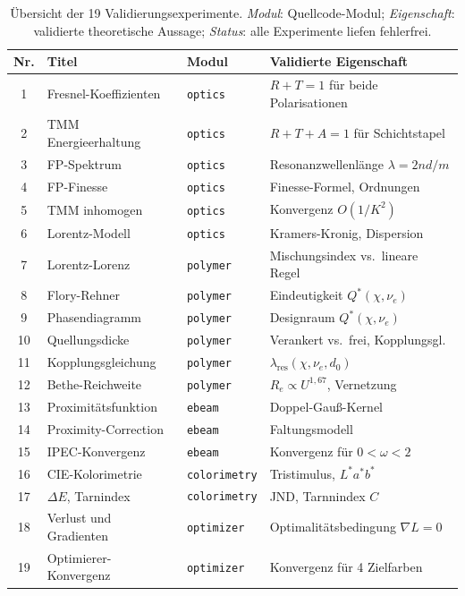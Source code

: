 ﻿\documentclass[a4paper,12pt]{article}
\theoremstyle{definition}
\begin{document}
	\begin{table}[htbp]
		\centering
		\caption{%
			Übersicht der 19 Validierungsexperimente.
			\emph{Modul}: Quellcode-Modul; \emph{Eigenschaft}: validierte
			theoretische Aussage; \emph{Status}: alle Experimente liefen
			fehlerfrei.
		}
		\label{tab:validierung}
		\small
		\begin{tabular}{clll}
			\toprule
			\textbf{Nr.} & \textbf{Titel} & \textbf{Modul} & \textbf{Validierte Eigenschaft} \\
			\midrule
			1  & Fresnel-Koeffizienten    & \texttt{optics}     & $R+T=1$ für beide Polarisationen \\
			2  & TMM Energieerhaltung     & \texttt{optics}     & $R+T+A=1$ für Schichtstapel \\
			3  & FP-Spektrum              & \texttt{optics}     & Resonanzwellenlänge $\lambda=2nd/m$ \\
			4  & FP-Finesse               & \texttt{optics}     & Finesse-Formel, Ordnungen \\
			5  & TMM inhomogen            & \texttt{optics}     & Konvergenz $O(1/K^2)$ \\
			6  & Lorentz-Modell           & \texttt{optics}     & Kramers-Kronig, Dispersion \\
			7  & Lorentz-Lorenz           & \texttt{polymer}    & Mischungsindex vs.\ lineare Regel \\
			8  & Flory-Rehner             & \texttt{polymer}    & Eindeutigkeit $Q^*(\chi,\nu_e)$ \\
			9  & Phasendiagramm           & \texttt{polymer}    & Designraum $Q^*(\chi,\nu_e)$ \\
			10 & Quellungsdicke           & \texttt{polymer}    & Verankert vs.\ frei, Kopplungsgl. \\
			11 & Kopplungsgleichung       & \texttt{polymer}    & $\lambda_\mathrm{res}(\chi,\nu_e,d_0)$ \\
			12 & Bethe-Reichweite         & \texttt{polymer}    & $R_e \propto U^{1{,}67}$, Vernetzung \\
			13 & Proximitätsfunktion      & \texttt{ebeam}      & Doppel-Gauß-Kernel \\
			14 & Proximity-Correction     & \texttt{ebeam}      & Faltungsmodell \\
			15 & IPEC-Konvergenz          & \texttt{ebeam}      & Konvergenz für $0<\omega<2$ \\
			16 & CIE-Kolorimetrie         & \texttt{colorimetry}& Tristimulus, $L^*a^*b^*$ \\
			17 & $\Delta E$, Tarnindex    & \texttt{colorimetry}& JND, Tarnnindex $C$ \\
			18 & Verlust und Gradienten   & \texttt{optimizer}  & Optimalitätsbedingung $\nabla L=0$ \\
			19 & Optimierer-Konvergenz    & \texttt{optimizer}  & Konvergenz für 4 Zielfarben \\
			\bottomrule
		\end{tabular}
	\end{table}
	
\end{document}
